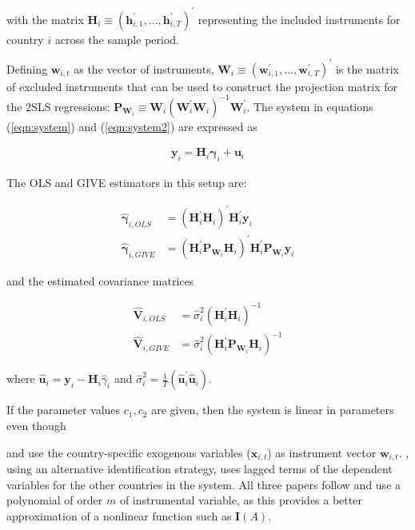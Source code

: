 \documentclass[../base.tex]{subfiles}
\begin{document}
with the matrix $\mathbf{H}_i \equiv (\mathbf{h}_{i,1}^{\prime},..., \mathbf{h}_{i,T}^{\prime})^{\prime}$ representing the included instruments for country $i$ across the sample period. 

Defining $\mathbf{w}_{i,t}$ as the vector of instruments, $\mathbf{W}_i \equiv (\mathbf{w}_{i,1}^{\prime},..., \mathbf{w}_{i,T}^{\prime})^{\prime}$ is the matrix of excluded instruments that can be used to construct the projection matrix for the 2SLS regressions: $\mathbf{P}_{\mathbf{W}_i} \equiv \mathbf{W}_i (\mathbf{W}_i^{\prime} \mathbf{W}_i)^{-1} \mathbf{W}_i^{\prime}$. The system in equations (\ref{eqn:system}) and (\ref{eqn:system2}) are expressed as

\begin{align}
	\mathbf{y}_i = \mathbf{H}_i \mathbf{\gamma}_i + \mathbf{u}_i \label{eqn:matrix_system}
\end{align}

The OLS and GIVE estimators in this setup are:

\begin{align}
	\hat{\mathbf{\gamma}}_{i, OLS} &= (\mathbf{H}_i^{\prime} \mathbf{H}_i)^{\prime} \mathbf{H}_i^{\prime} \mathbf{y}_i	\label{eqn:ols}\\	
	\hat{\mathbf{\gamma}}_{i, GIVE} &= (\mathbf{H}_i^{\prime} \mathbf{P}_{\mathbf{W}_i} \mathbf{H}_i)^{\prime} \mathbf{H}_i^{\prime} \mathbf{P}_{\mathbf{W}_i} \mathbf{y}_i \label{eqn:give}	
\end{align}

and the estimated covariance matrices

\begin{align*}
	\hat{\mathbf{V}}_{i, OLS} &= \hat{\sigma}^2_i (\mathbf{H}_i^{\prime} \mathbf{H}_i)^{-1} \\
	\hat{\mathbf{V}}_{i, GIVE} &= \hat{\sigma}^2_i (\mathbf{H}_i^{\prime} \mathbf{P}_{\mathbf{W}_i} \mathbf{H}_i)^{-1}
\end{align*}


where $\hat{\mathbf{u}}_i = \mathbf{y}_i - \mathbf{H}_i \hat{\gamma}_i$ and $\hat{\sigma}^2_i = \frac{1}{T} (\hat{\mathbf{u}}_i^{\prime} \hat{\mathbf{u}}_i)$. 

If the parameter values $c_1, c_2$ are given, then the system is linear in parameters even though 

\cite{pesaran2007econometrics} and \cite{massacci2007identification} use the country-specific exogenous variables ($\mathbf{x}_{i,t}$) as instrument vector $\mathbf{w}_{i,t}$. \cite{metiu2012sovereign}, using an alternative identification strategy, uses lagged terms of the dependent variables for the other countries in the system. All three papers follow \cite{kelejian1971two} and use a polynomial of order $m$ of instrumental variable, as this provides a better approximation of a nonlinear function such as $\mathbf{I}(A)$.
\end{document}
